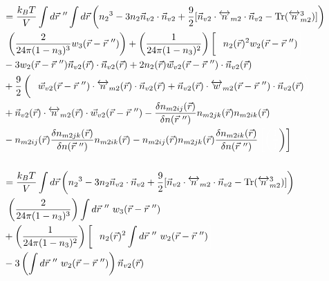 \documentclass[double,12pt]{beavtex}
\begin{document}
\begin{align}   %
&=\frac{k_BT}{V}\int d\vec r~''\int d\vec r \left( {n_2}^3-3n_2
    \vec{n}_{v2}\cdot\vec{n}_{v2} 
     +\frac{9}{2}[\vec{n}_{v2}\cdot{\overleftrightarrow{n}_{m2}}\cdot{
     \vec{n}_{v2}}-\operatorname{Tr}({\overleftrightarrow{n}^3_{m2}})]
     \right) \nonumber\\
     &~\left(\frac{2}{24\pi(1-n_3)^3} w_3(\vec r-\vec r~'')
     \right) 
     + \left(\frac{1}{24\pi(1-n_3)^2}\right)\left[\color{white}\frac{1}{1}
     \color{black}n_2(\vec r)^2
     w_2(\vec r-\vec r~'') \color{white}\right] \nonumber\\
     &- 3w_2(\vec r-\vec r~'')\vec n_{v2}
     (\vec r) \cdot \vec n_{v2}(\vec r) + 2n_2(\vec r)
     \vec w_{v2}(\vec r-\vec r~'')\cdot \vec n_{v2}(\vec r) \nonumber \\
     &+\frac{9}{2}\left(\color{white}\frac{1}{1}\color{black}\vec w_{v2}
     (\vec r-\vec r~'')
     \cdot \overleftrightarrow n_{m2}(\vec r)\cdot \vec n_{v2}( \vec r)
     +\vec n_{v2}(\vec r)\cdot \overleftrightarrow w_{m2}(\vec r-\vec r~'')
     \cdot \vec n_{v2}( \vec r)\color{white}\right) \nonumber\\
     &+ \vec n_{v2}(\vec r)\cdot \overleftrightarrow n_{m2}(\vec r) 
     \cdot \vec w_{v2}(\vec r-\vec r~'')
     -\frac{\delta n_{m2ij}(\vec r)}{\delta n(\vec r~'')}n_{m2jk}(\vec r)
     n_{m2ik}(\vec r) \nonumber \\     
     &-\color{black}n_{m2ij}(\vec r)\frac{\delta n_{m2jk}(\vec r)}{\delta n(\vec r~'')}
     n_{m2ik}(\vec r) - n_{m2ij}(\vec r)n_{m2jk}(\vec r)\frac{\delta n_{m2ik}(\vec r)}
     {\delta n(\vec r~'')} 
     \color{white}\left[\left(\frac{1}{1}\color{black}\right)\color{black}\right]   \\ \nonumber \\
%
&=\frac{k_BT}{V}\int d\vec r \left( {n_2}^3-3n_2
    \vec{n}_{v2}\cdot\vec{n}_{v2} 
     +\frac{9}{2}[\vec{n}_{v2}\cdot{\overleftrightarrow{n}_{m2}}\cdot{
     \vec{n}_{v2}}-\operatorname{Tr}({\overleftrightarrow{n}^3_{m2}})]
     \right) \nonumber\\
     &~\left(\frac{2}{24\pi(1-n_3)^3}\right) \int d\vec r~''~ w_3(\vec r
     -\vec r~'') \nonumber\\
     &+\left(\frac{1}{24\pi(1-n_3)^2}\right)\left[
     \color{white}\frac{1}{1}\color{black}n_2(\vec r)^2
     \int d\vec r~''~ w_2(\vec r-\vec r~'')
     \color{white}\right]\nonumber\\
     &- 3\left(\int d\vec r~''~w_2(\vec r-\vec r~'')\right)\vec n_{v2}(\vec r)

\end{align}
\end{document}
